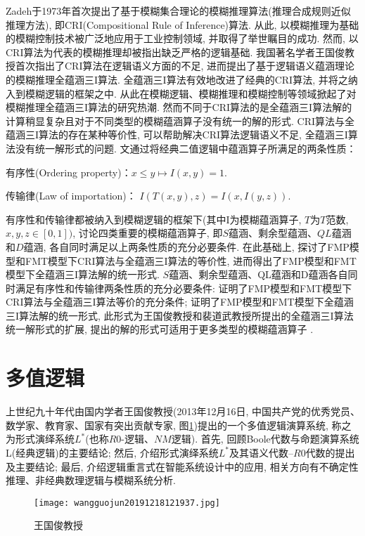 Zadeh于1973年首次提出了基于模糊集合理论的模糊推理算法(推理合成规则近似推理方法), 即CRI(Compositional Rule of Inference)算法. 从此, 以模糊推理为基础的模糊控制技术被广泛地应用于工业控制领域, 并取得了举世瞩目的成功. 然而, 以CRI算法为代表的模糊推理却被指出缺乏严格的逻辑基础. 我国著名学者王国俊教授首次指出了CRI算法在逻辑语义方面的不足, 进而提出了基于逻辑语义蕴涵理论的模糊推理全蕴涵三I算法. 全蕴涵三I算法有效地改进了经典的CRI算法, 并将之纳入到模糊逻辑的框架之中. 从此在模糊逻辑、模糊推理和模糊控制等领域掀起了对模糊推理全蕴涵三I算法的研究热潮. 然而不同于CRI算法的是全蕴涵三I算法解的计算稍显复杂且对于不同类型的模糊蕴涵算子没有统一的解的形式. CRI算法与全蕴涵三I算法的存在某种等价性, 可以帮助解决CRI算法逻辑语义不足, 全蕴涵三I算法没有统一解形式的问题.
文\cite{江欢 2009全蕴涵三I算法}通过将经典二值逻辑中蕴涵算子所满足的两条性质：

有序性(Ordering property)：$ x\leq y\longmapsto I(x,y)=1$.

传输律(Law of importation)： $I(T(x,y),z)=I(x,I(y,z))$.

有序性和传输律都被纳入到模糊逻辑的框架下(其中I为模糊蕴涵算子, $T$为$T$范数, $x,y,z\in [0,1])$, 讨论四类重要的模糊蕴涵算子, 即$S$蕴涵、剩余型蕴涵、$QL$蕴涵和$D$蕴涵, 各自同时满足以上两条性质的充分必要条件. 在此基础上, 探讨了FMP模型和FMT模型下CRI算法与全蕴涵三I算法的等价性, 进而得出了FMP模型和FMT模型下全蕴涵三I算法解的统一形式.
$S$蕴涵、剩余型蕴涵、QL蕴涵和D蕴涵各自同时满足有序性和传输律两条性质的充分必要条件: 证明了FMP模型和FMT模型下CRI算法与全蕴涵三I算法等价的充分条件; 证明了FMP模型和FMT模型下全蕴涵三I算法解的统一形式, 此形式为王国俊教授和裴道武教授所提出的全蕴涵三I算法统一解形式的扩展, 提出的解的形式可适用于更多类型的模糊蕴涵算子 .
\section{多值逻辑}
上世纪九十年代由国内学者王国俊教授(2013年12月16日, 中国共产党的优秀党员、数学家、教育家、国家有突出贡献专家, 图\ref{wangguojun20191218121937})提出的一个多值逻辑演算系统, 称之为形式演绎系统$L^*$(也称$R0$-逻辑、$NM$逻辑). 首先, 回顾Boole代数与命题演算系统L(经典逻辑)的主要结论; 然后, 介绍形式演绎系统$L^*$及其语义代数--$R0$代数的提出及主要结论; 最后, 介绍逻辑重言式在智能系统设计中的应用, 相关方向有不确定性推理、非经典数理逻辑与模糊系统分析.
\begin{figure}[H]
\centering
\texttt{[image: wangguojun20191218121937.jpg]}
\caption{王国俊教授}
\label{wangguojun20191218121937}
\end{figure}
